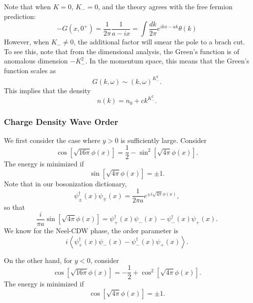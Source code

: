 \documentclass{SciPost}
\begin{document}
Note that when $K=0$, $K_-=0$, and the theory agrees with the free fermion prediction:
\begin{equation}
	-G(x, 0^+) = \frac{1}{2\pi} \frac{1}{a-ix}
	= \int \frac{dk}{2\pi} e^{ikx-ak} \theta(k)
\end{equation}
However, when $K_- \ne 0$, the additional factor will smear the pole to a brach cut. 
To see this, note that from the dimensional analysis, the Green's function is of anomalous dimension $-K_-^2$.
In the momentum space, this means that the Green's function scales as
\begin{equation}
	G(k,\omega) \sim (k,\omega)^{K_-^2}.
\end{equation}
This implies that the density 
\begin{equation}
	n(k) = n_0 + c k^{K_-^2}.
\end{equation}


\subsubsection{Charge Density Wave Order}
We first consider the case where $y>0$ is sufficiently large. 
Consider
\begin{equation}
	\cos\left[\sqrt{16\pi}\phi(x)\right] = \frac{1}{2} - \sin^2\left[\sqrt{4\pi}\phi(x)\right].
\end{equation}
The energy is minimized if 
\begin{equation}
	\sin\left[\sqrt{4\pi}\phi(x)\right] = \pm 1.
\end{equation}
Note that in our bosonization dictionary,
\begin{equation}
	\psi_{\pm}^\dagger(x)\psi_{\mp}(x) = \frac{1}{2\pi a} e^{\pm i\sqrt{4\pi}\phi(x)},
\end{equation}
so that
\begin{equation}
	\frac{i}{\pi a} \sin\left[\sqrt{4\pi}\phi(x)\right] = \psi_{+}^\dagger(x)\psi_{-}(x)-\psi_{-}^\dagger(x)\psi_{+}(x).
\end{equation}
We know for the Neel-CDW phase, the order parameter is
\begin{equation}
	i\left\langle \psi_{+}^\dagger(x)\psi_{-}(x)-\psi_{-}^\dagger(x)\psi_{+}(x) \right\rangle.
\end{equation}

On the other hand, for $y<0$, consider
\begin{equation}
	\cos\left[\sqrt{16\pi}\phi(x)\right] = -\frac{1}{2} + \cos^2\left[\sqrt{4\pi}\phi(x)\right].
\end{equation}
The energy is minimized if 
\begin{equation}
	\cos\left[\sqrt{4\pi}\phi(x)\right] = \pm 1.
\end{equation}
\end{document}
